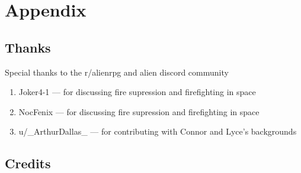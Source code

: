 \chapter{Appendix}

  


\section{Thanks}

\begin{rpg-commentbox}{Special thanks to the r/alienrpg and alien discord community}
    
    \begin{enumerate}
        \item Joker4-1 --- for discussing fire supression and firefighting in space
        \item NocFenix --- for discussing fire supression and firefighting in space
        \item u/\_ArthurDallas\_ --- for contributing with Connor and Lyce's backgrounds
    \end{enumerate}
\end{rpg-commentbox} 

\section{Credits}


